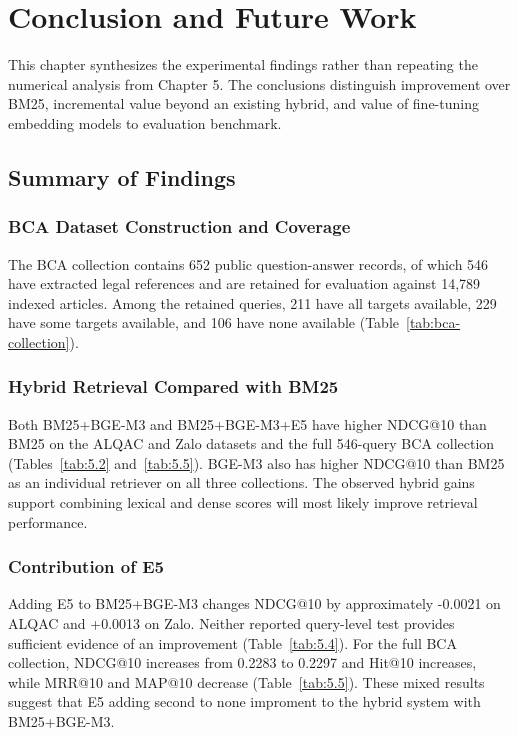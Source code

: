 \chapter{Conclusion and Future Work}

This chapter synthesizes the experimental findings rather than repeating the numerical analysis from Chapter 5. The conclusions distinguish improvement over BM25, incremental value beyond an existing hybrid, and value of fine-tuning embedding models to evaluation benchmark.

\section{Summary of Findings}

\subsection{BCA Dataset Construction and Coverage}

The BCA collection contains 652 public question-answer records, of which 546 have extracted legal references and are retained for evaluation against 14,789 indexed articles. Among the retained queries, 211 have all targets available, 229 have some targets available, and 106 have none available (Table~\ref{tab:bca-collection}). 

\subsection{Hybrid Retrieval Compared with BM25}

Both BM25+BGE-M3 and BM25+BGE-M3+E5 have higher NDCG@10 than BM25 on the ALQAC and Zalo datasets and the full 546-query BCA collection (Tables~\ref{tab:5.2} and~\ref{tab:5.5}). BGE-M3 also has higher NDCG@10 than BM25 as an individual retriever on all three collections. The observed hybrid gains support combining lexical and dense scores will most likely improve retrieval performance. 

\subsection{Contribution of E5}

Adding E5 to BM25+BGE-M3 changes NDCG@10 by approximately -0.0021 on ALQAC and +0.0013 on Zalo. Neither reported query-level test provides sufficient evidence of an improvement (Table~\ref{tab:5.4}). For the full BCA collection, NDCG@10 increases from 0.2283 to 0.2297 and Hit@10 increases, while MRR@10 and MAP@10 decrease (Table~\ref{tab:5.5}). These mixed results suggest that E5 adding second to none improment to the hybrid system with BM25+BGE-M3.

